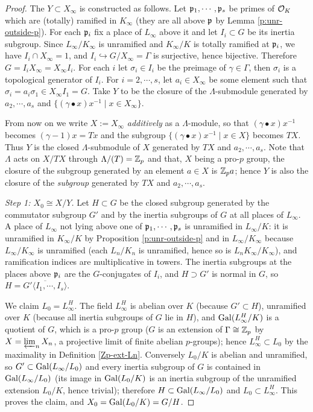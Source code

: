 \begin{proof}
The $Y\subset X_\infty$ is constructed as follows.
Let ${\mathfrak{p}}_1,\cdots,{\mathfrak{p}}_s$ be primes of ${\mathcal {O}}_K$ which are (totally) ramified in $K_\infty$
(they are all above ${\mathfrak{p}}$ by Lemma \ref{p:unr-outside-p}).
For each ${\mathfrak{p}}_i$ fix a place of $L_\infty$ above it and
let $I_i\subset G$ be its inertia subgroup.
Since $L_\infty/K_\infty$ is unramified
and $K_\infty/K$ is totally ramified at ${\mathfrak{p}}_i$, we have $I_i\cap X_\infty=1$,
and $I_i\hookrightarrow G/X_\infty=\Gamma$ is surjective, hence bijective.
Therefore $G=I_iX_\infty=X_\infty I_i$.
For each $i$ let $\sigma_i\in I_i$ be the preimage of $\gamma\in\Gamma$,
then $\sigma_i$ is a topological generator of $I_i$.
For $i=2,\cdots,s$, let $a_i\in X_\infty$ be some element such that
$\sigma_i=a_i\sigma_1\in X_\infty I_1=G$.
Take $Y$ to be the closure of the $\Lambda$-submodule generated by
$a_2,\cdots,a_s$ and $\{(\gamma\bullet x)x^{-1}\mid x\in X_\infty\}$.

From now on we write $X:=X_\infty$ \emph{additively} as a $\Lambda$-module,
so that $(\gamma\bullet x)x^{-1}$ becomes $(\gamma-1)x=Tx$ and the subgroup
$\{(\gamma\bullet x)x^{-1}\mid x\in X\}$ becomes $TX$.
Thus $Y$ is the closed $\Lambda$-submodule of $X$ generated by $TX$ and
$a_2,\cdots,a_s$. Note that $\Lambda$ acts on $X/TX$ through $\Lambda/(T)={\mathbb {Z}}_p$
and that, $X$ being a pro-$p$ group, the closure of the subgroup generated by an
element $a\in X$ is ${\mathbb {Z}}_pa$; hence $Y$ is also the closure of the
\emph{subgroup} generated by $TX$ and $a_2,\cdots,a_s$.

\emph{Step 1: $X_0\cong X/Y$.}
Let $H\subset G$ be the closed subgroup generated by the commutator subgroup
$G'$ and by the inertia subgroups of $G$ at all places of $L_\infty$.
A place of $L_\infty$ not lying above one of ${\mathfrak{p}}_1,\cdots,{\mathfrak{p}}_s$ is unramified
in $L_\infty/K$: it is unramified in $K_\infty/K$ by
Proposition \ref{p:unr-outside-p} and in $L_\infty/K_\infty$ because
$L_\infty/K_\infty$ is unramified (each $L_n/K_n$ is unramified, hence so is
$L_nK_\infty/K_\infty$), and ramification indices are multiplicative in towers.
The inertia subgroups at the places above ${\mathfrak{p}}_i$ are the $G$-conjugates of
$I_i$, and $H\supset G'$ is normal in $G$, so
$H=\overline{G'\langle I_1,\cdots,I_s\rangle}$.

We claim $L_0=L_\infty^H$.
The field $L_\infty^H$ is abelian over $K$ (because $G'\subset H$), unramified
over $K$ (because all inertia subgroups of $G$ lie in $H$), and
${\mathrm{Gal}}(L_\infty^H/K)$ is a quotient of $G$, which is a pro-$p$ group ($G$ is an
extension of $\Gamma\cong{\mathbb {Z}}_p$ by $X=\varprojlim_nX_n$, a projective limit of
finite abelian $p$-groups); hence $L_\infty^H\subset L_0$ by the maximality in
Definition \ref{Zp-ext-Ln}.
Conversely $L_0/K$ is abelian and unramified, so $G'\subset{\mathrm{Gal}}(L_\infty/L_0)$
and every inertia subgroup of $G$ is contained in ${\mathrm{Gal}}(L_\infty/L_0)$ (its image
in ${\mathrm{Gal}}(L_0/K)$ is an inertia subgroup of the unramified extension $L_0/K$,
hence trivial); therefore $H\subset{\mathrm{Gal}}(L_\infty/L_0)$ and
$L_0\subset L_\infty^H$. This proves the claim, and $X_0={\mathrm{Gal}}(L_0/K)=G/H$.


\end{proof}
